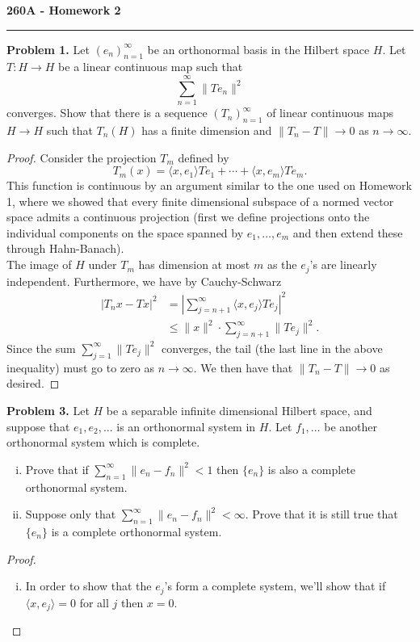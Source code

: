 \documentclass[11pt,letterpaper]{report}
\begin{document}
\begin{center}
{\bf \Large 260A - Homework 2} %
\vspace{0.2cm}
\hrule
\end{center}

\noindent\textbf{Problem 1. }
Let $(e_n)_{n=1}^\infty$ be an orthonormal basis in the Hilbert space $H$. Let $T: H\to H$ be a linear continuous map such that
\[
\sum_{n=1}^\infty \|Te_n\|^2
\]
converges. Show that there is a sequence $(T_n)_{n=1}^\infty$ of linear continuous maps $H\to H$ such that $T_n(H)$ has a finite dimension and $\|T_n-T\|\to 0$ as $n\to \infty$.
\begin{proof}
	Consider the projection $T_m$ defined by
	\[
	T_m(x) = \langle x, e_1\rangle Te_1 + \cdots +\langle x, e_m\rangle Te_m.
	\]
	This function is continuous by an argument similar to the one used on Homework 1, where we showed that every finite dimensional subspace of a normed vector space admits a continuous projection (first we define projections onto the individual components on the space spanned by $e_1, \ldots, e_m$ and then extend these through Hahn-Banach).\\

	\noindent The image of $H$ under $T_m$ has dimension at most $m$ as the $e_j$'s are linearly independent. Furthermore, we have by Cauchy-Schwarz
	\begin{align*}
	|T_nx - Tx|^2 &= \left|\sum_{j = n+1}^\infty \langle x, e_j\rangle Te_j\right|^2\\
	&\leq \|x\|^2\cdot \sum_{j=n+1}^\infty \|Te_j\|^2.
	\end{align*}
	Since the sum $\sum_{j=1}^\infty\|Te_j\|^2$ converges, the tail (the last line in the above inequality) must go to zero as $n\to \infty$. We then have that $\|T_n-T\|\to 0$ as desired.
\end{proof}

\noindent\textbf{Problem 3. }
Let $H$ be a separable infinite dimensional Hilbert space, and suppose that $e_1, e_2, \ldots$ is an orthonormal system in $H$. Let $f_1, \ldots$ be another orthonormal system which is complete.
\begin{enumerate}[(i)]
	\item Prove that if $\sum_{n=1}^\infty \|e_n-f_n\|^2<1$ then $\{e_n\}$ is also a complete orthonormal system.
	\item Suppose only that $\sum_{n=1}^\infty \|e_n-f_n\|^2<\infty$. Prove that it is still true that $\{e_n\}$ is a complete orthonormal system.
\end{enumerate}
\begin{proof}
	\begin{enumerate}[(i)]
		\item In order to show that the $e_j$'s form a complete system, we'll show that if $\langle x, e_j\rangle =0 $ for all $j$ then $x = 0$.
	\end{enumerate}
\end{proof}
\end{document}
